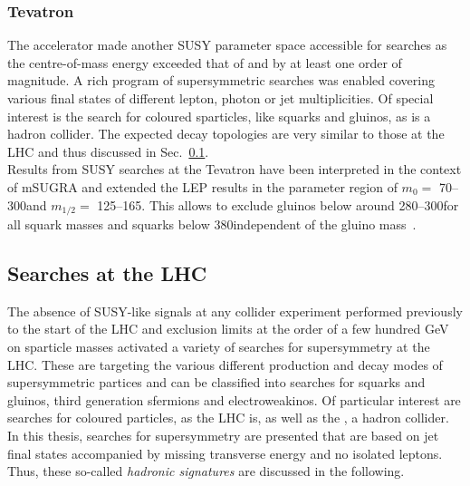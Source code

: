 \subsubsection*{Tevatron} 
The \tevatron accelerator made another SUSY parameter space accessible for searches as the centre-of-mass energy exceeded that of \hera and \lep by at least one order of magnitude. A rich program of supersymmetric searches was enabled covering various final states of different lepton, photon or jet multiplicities. Of special interest is the search for coloured sparticles, like squarks and gluinos, as \tevatron is a hadron collider. The expected decay topologies are very similar to those at the LHC and thus discussed in Sec.~\ref{subsec:susy_LHC_searches}. \\
Results from SUSY searches at the Tevatron have been interpreted in the context of mSUGRA and extended the LEP results in the parameter region of $m_{0} =$ 70--300\gev and $m_{1/2} =$ 125--165\gev. This allows to exclude gluinos below around 280--300\gev for all squark masses and squarks below $380$\gev independent of the gluino mass~\cite{CDFLimits, D0Limits, Abazov200934}. 

\subsection{Searches at the LHC}
\label{subsec:susy_LHC_searches}
The absence of SUSY-like signals at any collider experiment performed previously to the start of the LHC and exclusion limits at the order of a few hundred GeV on sparticle masses activated a variety of searches for supersymmetry at the LHC. These are targeting the various different production and decay modes of supersymmetric partices and can be classified into searches for squarks and gluinos, third generation sfermions and electroweakinos. Of particular interest are searches for coloured particles, as the LHC is, as well as the \tevatron, a hadron collider. In this thesis, searches for supersymmetry are presented that are based on jet final states accompanied by missing transverse energy and no isolated leptons. Thus, these so-called \textit{hadronic signatures} are discussed in the following.


